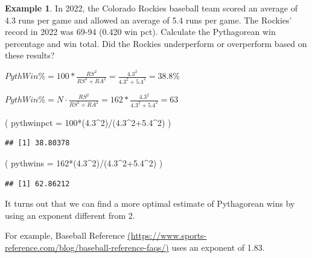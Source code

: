 \documentclass[
  11pt,
]{book}
\newenvironment{Shaded}{\begin{snugshade}}{\end{snugshade}}
\newcommand{\AttributeTok}[1]{\textcolor[rgb]{0.77,0.63,0.00}{#1}}
\newcommand{\DecValTok}[1]{\textcolor[rgb]{0.00,0.00,0.81}{#1}}
\newcommand{\FloatTok}[1]{\textcolor[rgb]{0.00,0.00,0.81}{#1}}
\newcommand{\NormalTok}[1]{#1}
\newcommand{\SpecialCharTok}[1]{\textcolor[rgb]{0.00,0.00,0.00}{#1}}
\theoremstyle{definition}
\theoremstyle{definition}
\newtheorem{example}{Example}[chapter]
\theoremstyle{definition}
\theoremstyle{definition}
\theoremstyle{remark}
\begin{document}
\begin{example}
In 2022, the Colorado Rockies baseball team scored an average of 4.3 runs per game and allowed an average of 5.4 runs per game. The Rockies' record in 2022 was 69-94 (0.420 win pct). Calculate the Pythagorean win percentage and win total. Did the Rockies underperform or overperform based on these results?
\end{example}

\(PythWin\% = 100 * \frac{RS^2}{RS^2+RA^2} = \frac{4.3^2}{4.3^2+5.4^2} = 38.8\%\)

\(PythWin\% = N \cdot \frac{RS^2}{RS^2+RA^2} = 162 * \frac{4.3^2}{4.3^2+5.4^2} = 63\)

\begin{Shaded}
\begin{Highlighting}[]
\NormalTok{( }\AttributeTok{pythwinpct =} \DecValTok{100}\SpecialCharTok{*}\NormalTok{(}\FloatTok{4.3}\SpecialCharTok{\^{}}\DecValTok{2}\NormalTok{)}\SpecialCharTok{/}\NormalTok{(}\FloatTok{4.3}\SpecialCharTok{\^{}}\DecValTok{2}\FloatTok{+5.4}\SpecialCharTok{\^{}}\DecValTok{2}\NormalTok{) )}
\end{Highlighting}
\end{Shaded}

\begin{verbatim}
## [1] 38.80378
\end{verbatim}

\begin{Shaded}
\begin{Highlighting}[]
\NormalTok{( }\AttributeTok{pythwins =} \DecValTok{162}\SpecialCharTok{*}\NormalTok{(}\FloatTok{4.3}\SpecialCharTok{\^{}}\DecValTok{2}\NormalTok{)}\SpecialCharTok{/}\NormalTok{(}\FloatTok{4.3}\SpecialCharTok{\^{}}\DecValTok{2}\FloatTok{+5.4}\SpecialCharTok{\^{}}\DecValTok{2}\NormalTok{) )}
\end{Highlighting}
\end{Shaded}

\begin{verbatim}
## [1] 62.86212
\end{verbatim}

\newpage

It turns out that we can find a more optimal estimate of Pythagorean wins by using an exponent different from 2.

For example, Baseball Reference \href{https://www.sports-reference.com/blog/baseball-reference-faqs/}{(https://www.sports-reference.com/blog/baseball-reference-faqs/)} uses an exponent of 1.83.
\end{document}
